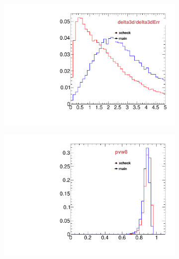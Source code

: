 \begin{figure}
\begin{subfigure}[b]{0.2\textwidth}
                \includegraphics[width=\textwidth]{Figures/VariablesComparison/Data_barrel_figs/pvips}
                \label{fig:Data_barrel_pvips}
        \end{subfigure}
        \begin{subfigure}[b]{0.2\textwidth}
                \centering
                \includegraphics[width=\textwidth]{Figures/VariablesComparison/Data_barrel_figs/pvw8}
                \label{fig:Data_barrel_pvw8}
        \end{subfigure}
        \begin{subfigure}[b]{0.2\textwidth}
                \centering

\end{subfigure}
\end{figure}
